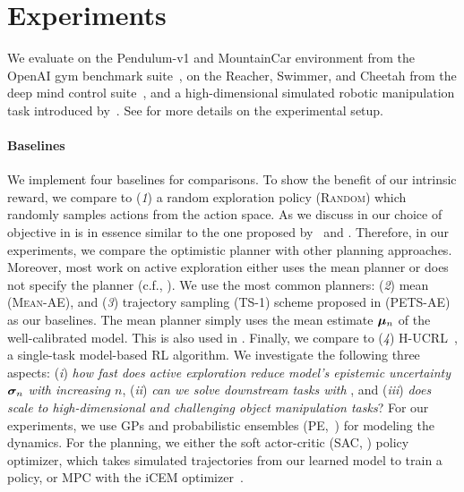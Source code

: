 \section{Experiments}\label{sec:experiments}
We evaluate \opacex on the Pendulum-v1 and MountainCar environment from the OpenAI gym benchmark suite~\citep{brockman2016openai}, on the Reacher, Swimmer, and Cheetah from the deep mind control suite~\citep{tassa2018deepmind}, and a high-dimensional simulated robotic manipulation task introduced by~\citet{li2020towards}. See  for more details on the experimental setup. 
\paragraph{Baselines}
We implement four baselines for comparisons. To show the benefit of our intrinsic reward, we compare \opacex to (\emph{1}) a random exploration policy (\textsc{Random}) which randomly samples actions from the action space. As we discuss in  our choice of objective in  is in essence similar to the one proposed by~\cite{pathak2019self} and \cite{sekar2020planning}. Therefore, in our experiments, we compare the optimistic planner with other planning approaches.
Moreover, most work on active exploration either uses the mean planner or does not specify the planner (c.f., ). We use the most common planners: (\emph{2}) mean (\textsc{Mean-AE}), and (\emph{3}) trajectory sampling (TS-1) scheme proposed in \cite{chua2018pets} (\textsc{PETS-AE}) as our baselines.
The mean planner simply uses the mean estimate ${\bm{\mu}}_n$  of the well-calibrated model. 
This is also used in \cite{active_learning_gp}.
Finally, we compare \opacex to (\emph{4}) H-UCRL~\citep{curi2020efficient}, a single-task model-based RL algorithm.
We investigate the following three aspects: (\emph{i}) {\em how fast does active exploration reduce model's epistemic uncertainty ${\bm{\sigma}}_n$ with increasing $n$}, (\emph{ii}) {\em can we solve downstream tasks with \opacex}, and (\emph{iii}) {\em does \opacex scale to high-dimensional and challenging object manipulation tasks}? For our experiments, we use GPs and probabilistic ensembles (PE,~\cite{lakshminarayanan2017simple}) for modeling the dynamics. For the planning, we either the soft actor-critic (SAC, \cite{sac}) policy optimizer, which takes simulated trajectories from our learned model to train a policy, or MPC with the iCEM optimizer~\citep{iCem}.
